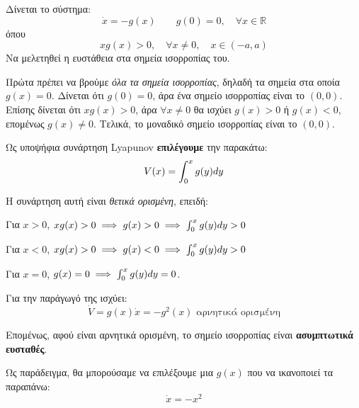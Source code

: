 \documentclass[11pt,a4paper,notitlepage,fleqn]{article}
\begin{document}
\begin{exercise}
	Δίνεται το σύστημα:
	\[
	\dot x = -g(x) \qquad g(0) = 0,\quad \forall x \in \mathbb R
	\]
	όπου
	\[
	xg(x) > 0,\quad \forall x\neq 0,\quad x\in (-a,a)
	\]
	Να μελετηθεί η ευστάθεια στα σημεία ισορροπίας του.
	
	\tcblower
	
	Πρώτα πρέπει να βρούμε \textit{όλα τα σημεία ισορροπίας}, δηλαδή τα σημεία
	στα οποία \( g(x) = 0 \). Δίνεται ότι \( g(0) = 0 \), άρα ένα σημείο ισορροπίας
	είναι το \( (0,0) \). Επίσης δίνεται ότι \( xg(x) > 0 \), άρα \( \forall x \neq 0 \)
	θα ισχύει \( g(x) > 0 \) ή \( g(x) <0 \), επομένως \( g(x) \neq 0 \). Τελικά,
	το μοναδικό σημείο ισορροπίας είναι το \( (0,0) \).
	
	Ως υποψήφια συνάρτηση Lyapunov \textbf{επιλέγουμε} την παρακάτω:
	\[
	V(x) = \int_0^x g(y) d y
	\]
	
	Η συνάρτηση αυτή είναι \textit{θετικά ορισμένη}, επειδή: \begin{inparaenum}[(a)]
		\item Για \( x>0 \), \( xg(x) > 0 \implies g(x) > 0 \implies \int_{0}^{x} g(y)d y > 0\)
		\item Για \( x<0 \), \( xg(x) > 0 \implies g(x) < 0 \implies \int_{0}^{x} g(y)d y > 0 \)
		\item Για \( x=0 \), \( g(x) = 0 \implies \int_0^x g(y)d y = 0 \).
	\end{inparaenum}
	
	Για την παράγωγό της ισχύει:
	\[
	\dot V = g(x)\dot x = -g^2(x) \text{ αρνητικά ορισμένη}
	\]
	
	Επομένως, αφού είναι αρνητικά ορισμένη, το σημείο ισορροπίας είναι \textbf{ασυμπτωτικά ευσταθές}.
	
	Ως παράδειγμα, θα μπορούσαμε να επιλέξουμε μια \( g(x) \) που να ικανοποιεί τα
	παραπάνω:
	\[
	\dot x = -x^2
	\]
\end{exercise}
\end{document}
